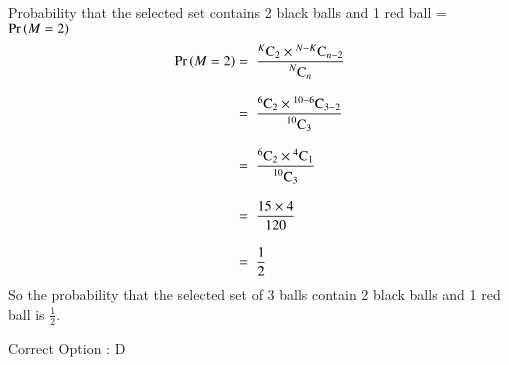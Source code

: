 \documentclass[journal,12pt,twocolumn]{IEEEtran}
\begin{document}
Probability that the selected set contains 2 black balls and 1 red ball = $\Pr\left(M = 2\right)$\\
\begin{align}
    \Pr\left(M = 2\right) = \hspace{0.2cm}& \frac{{}^{K}\mathrm{C}_{2} \times {}^{N-K}\mathrm{C}_{n-2}}{\displaystyle{{}^{N}\mathrm{C}_{n}}}\\[0.3cm]
               = \hspace{0.2cm}& \frac{{}^{6}\mathrm{C}_{2} \times {}^{10-6}\mathrm{C}_{3-2}}{\displaystyle{{}^{10}\mathrm{C}_{3}}}\\[0.3cm]
               = \hspace{0.2cm}& \frac{{}^{6}\mathrm{C}_{2} \times {}^{4}\mathrm{C}_{1}}{\displaystyle{{}^{10}\mathrm{C}_{3}}}\\[0.3cm]
               = \hspace{0.2cm}& \frac{15 \times 4}{120}\\[0.3cm]
               = \hspace{0.2cm}& \frac{1}{2}
\end{align}
So the probability that the selected set of 3 balls contain 2 black balls and 1 red ball is $\displaystyle{\frac{1}{2}}$.
\begin{center}
    Correct Option : D
\end{center}
\end{document}
